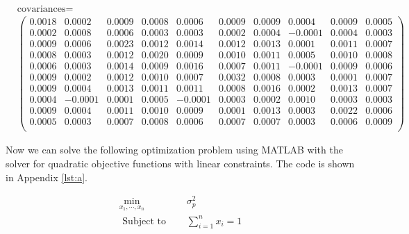 \documentclass[12pt]{article}
\begin{document}
\[
    \begin{aligned}
         & \text{covariances} = \\
         & \left(
        \begin{array}{rrrrrrrrrr}
            0.0018 & 0.0002  & 0.0009 & 0.0008 & 0.0006  & 0.0009 &
            0.0009 & 0.0004  & 0.0009 & 0.0005                      \\
            0.0002 & 0.0008  & 0.0006 & 0.0003 & 0.0003  & 0.0002 &
            0.0004 & -0.0001 & 0.0004 & 0.0003                      \\
            0.0009 & 0.0006  & 0.0023 & 0.0012 & 0.0014  & 0.0012 &
            0.0013 & 0.0001  & 0.0011 & 0.0007                      \\
            0.0008 & 0.0003  & 0.0012 & 0.0020 & 0.0009  & 0.0010 &
            0.0011 & 0.0005  & 0.0010 & 0.0008                      \\
            0.0006 & 0.0003  & 0.0014 & 0.0009 & 0.0016  & 0.0007 &
            0.0011 & -0.0001 & 0.0009 & 0.0006                      \\
            0.0009 & 0.0002  & 0.0012 & 0.0010 & 0.0007  & 0.0032 &
            0.0008 & 0.0003  & 0.0001 & 0.0007                      \\
            0.0009 & 0.0004  & 0.0013 & 0.0011 & 0.0011  & 0.0008 &
            0.0016 & 0.0002  & 0.0013 & 0.0007                      \\
            0.0004 & -0.0001 & 0.0001 & 0.0005 & -0.0001 & 0.0003 &
            0.0002 & 0.0010  & 0.0003 & 0.0003                      \\
            0.0009 & 0.0004  & 0.0011 & 0.0010 & 0.0009  & 0.0001 &
            0.0013 & 0.0003  & 0.0022 & 0.0006                      \\
            0.0005 & 0.0003  & 0.0007 & 0.0008 & 0.0006  & 0.0007 &
            0.0007 & 0.0003  & 0.0006 & 0.0009                      \\
        \end{array}
        \right)
    \end{aligned}
\]

Now we can solve the following optimization problem using MATLAB with the
solver for quadratic objective functions with linear constraints.
The code is shown in Appendix \ref{lst:a}.

\[
    \begin{aligned}
        \min _{x_1, \cdots, x_n} & \quad \sigma_p^2         \\
        \text { Subject to }     & \quad \sum_{i=1}^n x_i=1 \\
    \end{aligned}
\]
\end{document}
